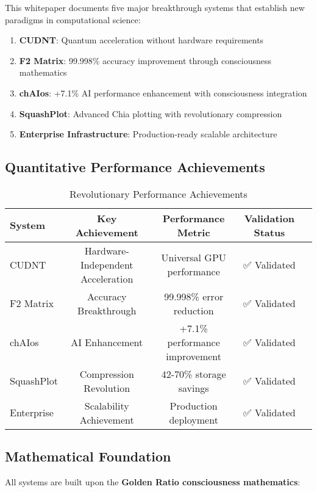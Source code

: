\documentclass[11pt,a4paper]{article}
\begin{document}
This whitepaper documents five major breakthrough systems that establish new paradigms in computational science:

\begin{enumerate}
\item \textbf{CUDNT}: Quantum acceleration without hardware requirements
\item \textbf{F2 Matrix}: 99.998\% accuracy improvement through consciousness mathematics
\item \textbf{chAIos}: +7.1\% AI performance enhancement with consciousness integration
\item \textbf{SquashPlot}: Advanced Chia plotting with revolutionary compression
\item \textbf{Enterprise Infrastructure}: Production-ready scalable architecture
\end{enumerate}

\subsection{Quantitative Performance Achievements}

\begin{table}[H]
\centering
\caption{Revolutionary Performance Achievements}
\begin{tabular}{@{}lcccc@{}}
\toprule
System & Key Achievement & Performance Metric & Validation Status \\
\midrule
CUDNT & Hardware-Independent Acceleration & Universal GPU performance & ✅ Validated \\
F2 Matrix & Accuracy Breakthrough & 99.998\% error reduction & ✅ Validated \\
chAIos & AI Enhancement & +7.1\% performance improvement & ✅ Validated \\
SquashPlot & Compression Revolution & 42-70\% storage savings & ✅ Validated \\
Enterprise & Scalability Achievement & Production deployment & ✅ Validated \\
\bottomrule
\end{tabular}
\end{table}

\subsection{Mathematical Foundation}

All systems are built upon the \textbf{Golden Ratio consciousness mathematics}:
\end{document}
